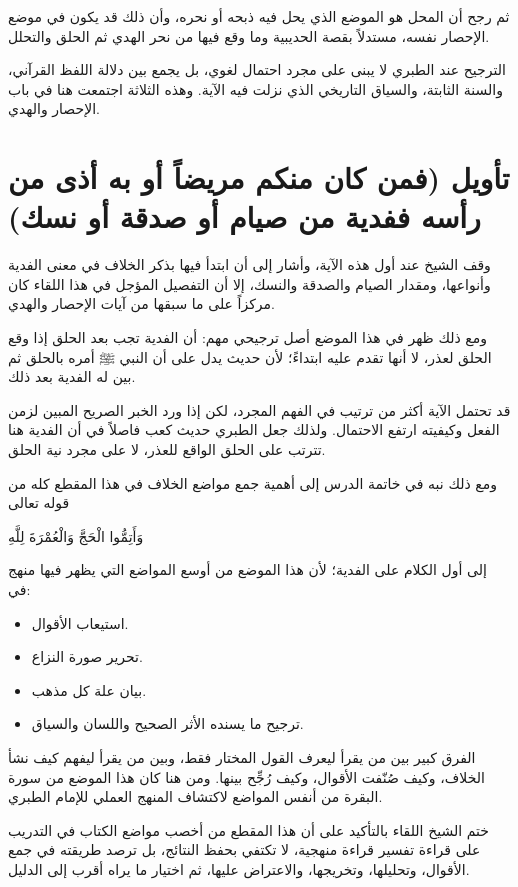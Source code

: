 ثم رجح  أن المحل هو الموضع الذي يحل فيه ذبحه أو نحره، وأن ذلك قد يكون في موضع الإحصار نفسه، مستدلاً بقصة الحديبية وما وقع فيها من نحر الهدي ثم الحلق والتحلل.

\begin{fawaid}
الترجيح عند الطبري لا يبنى على مجرد احتمال لغوي، بل يجمع بين دلالة اللفظ القرآني، والسنة الثابتة، والسياق التاريخي الذي نزلت فيه الآية. وهذه الثلاثة اجتمعت هنا في باب الإحصار والهدي.
\end{fawaid}

\separator

\section{تأويل (فمن كان منكم مريضاً أو به أذى من رأسه ففدية من صيام أو صدقة أو نسك)}
وقف الشيخ عند أول هذه الآية، وأشار إلى أن  ابتدأ فيها بذكر الخلاف في معنى الفدية وأنواعها، ومقدار الصيام والصدقة والنسك، إلا أن التفصيل المؤجل في هذا اللقاء كان مركزاً على ما سبقها من آيات الإحصار والهدي.

ومع ذلك ظهر في هذا الموضع أصل ترجيحي مهم: أن الفدية تجب بعد الحلق إذا وقع الحلق لعذر، لا أنها تقدم عليه ابتداءً؛ لأن حديث  يدل على أن النبي ﷺ أمره بالحلق ثم بين له الفدية بعد ذلك.

\begin{fawaid}
قد تحتمل الآية أكثر من ترتيب في الفهم المجرد، لكن إذا ورد الخبر الصريح المبين لزمن الفعل وكيفيته ارتفع الاحتمال. ولذلك جعل الطبري حديث كعب فاصلاً في أن الفدية هنا تترتب على الحلق الواقع للعذر، لا على مجرد نية الحلق.
\end{fawaid}

ومع ذلك نبه في خاتمة الدرس إلى أهمية جمع مواضع الخلاف في هذا المقطع كله من قوله تعالى \begin{ayah}وَأَتِمُّوا الْحَجَّ وَالْعُمْرَةَ لِلَّهِ\end{ayah} إلى أول الكلام على الفدية؛ لأن هذا الموضع من أوسع المواضع التي يظهر فيها منهج  في:
\begin{itemize}
    \item استيعاب الأقوال.
    \item تحرير صورة النزاع.
    \item بيان علة كل مذهب.
    \item ترجيح ما يسنده الأثر الصحيح واللسان والسياق.
\end{itemize}

\begin{fawaid}
الفرق كبير بين من يقرأ ليعرف القول المختار فقط، وبين من يقرأ ليفهم كيف نشأ الخلاف، وكيف صُنّفت الأقوال، وكيف رُجِّح بينها. ومن هنا كان هذا الموضع من سورة البقرة من أنفس المواضع لاكتشاف المنهج العملي للإمام الطبري.
\end{fawaid}

\separator

ختم الشيخ اللقاء بالتأكيد على أن هذا المقطع من أخصب مواضع الكتاب في التدريب على قراءة تفسير  قراءة منهجية، لا تكتفي بحفظ النتائج، بل ترصد طريقته في جمع الأقوال، وتحليلها، وتخريجها، والاعتراض عليها، ثم اختيار ما يراه أقرب إلى الدليل.
